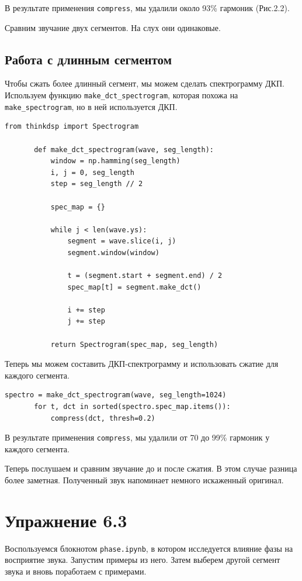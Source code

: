 \documentclass[a4paper,12pt]{report}
\begin{document}
    В результате применения \texttt{compress}, мы удалили около 93\% гармоник (Рис.2.2).

    Сравним звучание двух сегментов. На слух они одинаковые.

\section{Работа с длинным сегментом}    
    Чтобы сжать более длинный сегмент, мы можем сделать спектрограмму ДКП. Используем функцию \texttt{make\_dct\_spectrogram}, которая похожа на \texttt{make\_spectrogram}, но в ней используется ДКП.
\begin{lstlisting}[caption=Функция make\_dct\_spectrogram]
       from thinkdsp import Spectrogram

       def make_dct_spectrogram(wave, seg_length):
           window = np.hamming(seg_length)
           i, j = 0, seg_length
           step = seg_length // 2

           spec_map = {}

           while j < len(wave.ys):
               segment = wave.slice(i, j)
               segment.window(window)

               t = (segment.start + segment.end) / 2
               spec_map[t] = segment.make_dct()

               i += step
               j += step

           return Spectrogram(spec_map, seg_length)
\end{lstlisting}

    Теперь мы можем составить ДКП-спектрограмму и использовать сжатие для каждого сегмента.
\begin{lstlisting}[caption=Сжатие сегментов]
       spectro = make_dct_spectrogram(wave, seg_length=1024)
       for t, dct in sorted(spectro.spec_map.items()):
           compress(dct, thresh=0.2)
\end{lstlisting}

       В результате применения \texttt{compress}, мы удалили от 70 до 99\% гармоник у каждого сегмента.
       
       Теперь послушаем и сравним звучание до и после сжатия. В этом случае разница более заметная. Полученный звук напоминает немного искаженный оригинал.
       
\chapter{Упражнение 6.3}
    Воспользуемся блокнотом \texttt{phase.ipynb}, в котором исследуется влияние фазы на восприятие звука. Запустим примеры из него. Затем выберем другой сегмент звука и вновь поработаем с примерами.
 
\end{document}

